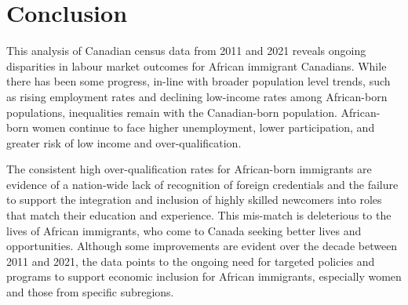\documentclass[12pt]{article}
\begin{document}
\clearpage
\section*{Conclusion}

This analysis of Canadian census data from 2011 and 2021 reveals ongoing disparities in labour market outcomes for African immigrant Canadians. While there has been some progress, in-line with broader population level trends, such as rising employment rates and declining low-income rates among African-born populations, inequalities remain with the Canadian-born population. African-born women continue to face higher unemployment, lower participation, and greater risk of low income and over-qualification. 

The consistent high over-qualification rates for African-born immigrants are evidence of a nation-wide lack of recognition of foreign credentials and the failure to support the integration and inclusion of highly skilled newcomers into roles that match their education and experience. This mis-match is deleterious to the lives of African immigrants, who come to Canada seeking better lives and opportunities. Although some improvements are evident over the decade between 2011 and 2021, the data points to the ongoing need for targeted policies and programs to support economic inclusion  for African immigrants, especially women and those from specific subregions. 
\end{document}
